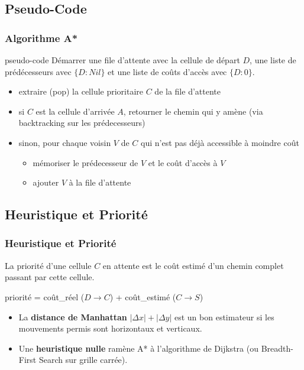 \documentclass{beamer}
\begin{document}
\subsection{Pseudo-Code}
\begin{frame}
  \frametitle{Algorithme A*}
  \begin{block}{pseudo-code}
    Démarrer une file d'attente avec la cellule de départ $D$, une liste de
    prédécesseurs avec $\{D:Nil\}$ et une liste de coûts d'accès avec
    $\{D:0\}$.
    \medskip
    
    \begin{itemize}
    \item<3-> extraire (pop) la cellule prioritaire $C$ de la file d'attente
    \item<4-> si $C$ est la cellule d'arrivée $A$, retourner le chemin qui y amène
          (via backtracking sur les prédecesseurs)
    \item<5-> sinon, pour chaque voisin $V$ de $C$ qui n'est pas déjà accessible
      à moindre coût
      \begin{itemize}
      \item<6-> mémoriser le prédecesseur de $V$ et le coût d'accès à $V$
      \item<7-> ajouter $V$ à la file d'attente
      \end{itemize}
    \end{itemize}    
  \end{block}
\end{frame}

\subsection{Heuristique et Priorité}
\begin{frame}
  \frametitle{Heuristique et Priorité}
  La priorité d'une cellule $C$ en attente est le coût estimé d'un chemin
  complet passant par cette cellule.
  \smallskip

  priorité = coût\_réel ($D \rightarrow C$) + coût\_estimé ($C\rightarrow S$)

  \medskip
  \begin{itemize}
  \item<3->{La \textbf{distance de Manhattan} $|\Delta x| + |\Delta y|$
    est un bon estimateur si les mouvements permis sont horizontaux et verticaux.}
  \par
  \item<4>{Une \textbf{heuristique nulle} ramène A* à l'algorithme de Dijkstra
      (ou Breadth-First Search sur grille carrée).}
  \end{itemize}
\end{frame}
\end{document}
